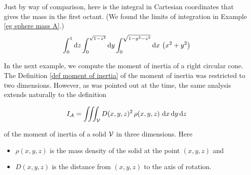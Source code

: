 \begin{eg}
\noindent
Just by way of comparison, here is the integral in Cartesian 
coordinates that gives the mass in the first octant. (We found the limits
of integration in Example \ref{eg sphere mass A}.)
\begin{equation*}
\int_0^1\dee{z}\int_0^{\sqrt{1-z^2}}\dee{y}\int_0^{\sqrt{1-y^2-z^2}}  \dee{x}\ 
           \big(x^2+y^2\big)
\end{equation*}

\end{eg}

In the next example, we compute the moment of inertia of a right circular cone.
The Definition \ref{def moment of inertia} of the moment of inertia
was restricted to two dimensions. However, as was pointed out at the time, 
the same analysis extends naturally to the definition 
\begin{impeqn}\label{eqn mom of inertia 3d}
\begin{equation*}
I_\cA=\tripInt_\cV D(x,y,z)^2\,\rho(x,y,z)\ \dee{x}\,\dee{y}\,\dee{z}
\end{equation*}
\end{impeqn}
\noindent of the moment of inertia of a solid $\mathcal{V}$ in three dimensions. Here
\begin{itemize}\itemsep1pt \parskip0pt \parsep0pt
\item 
$\rho(x,y,z)$ is the mass density of the solid at the point $(x,y,z)$ and 
\item
$D(x,y,z)$ is the distance from $(x,y,z)$ to the axis of rotation.
\end{itemize} 

